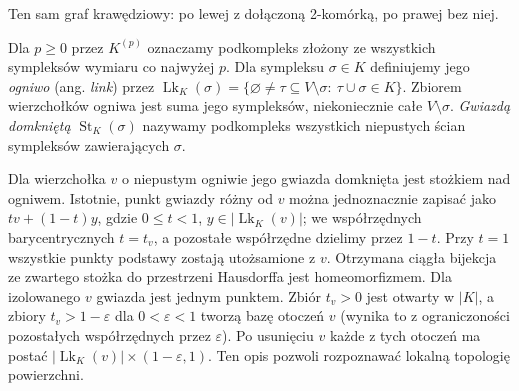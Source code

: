 \begin{samepage}
\begin{center}
\begin{minipage}{.96\linewidth}\centering
{}\par\smallskip

{\footnotesize Ten sam graf krawędziowy: po lewej z dołączoną
2-komórką, po prawej bez niej.}
\end{minipage}
\end{center}
\end{samepage}

\begin{definicja}
Dla $p\ge0$ przez $K^{(p)}$ oznaczamy podkompleks
złożony ze wszystkich sympleksów wymiaru co najwyżej $p$.
Dla sympleksu $\sigma\in K$ definiujemy jego
\emph{ogniwo} (ang. \emph{link}) przez
$\operatorname{Lk}_K(\sigma)
=\{\varnothing\ne\tau\subseteq V\setminus\sigma:
\ \tau\cup\sigma\in K\}$.
Zbiorem wierzchołków ogniwa jest suma jego sympleksów,
niekoniecznie całe $V\setminus\sigma$. \emph{Gwiazdą domkniętą}
$\operatorname{St}_K(\sigma)$ nazywamy podkompleks
wszystkich niepustych ścian sympleksów zawierających $\sigma$.
\end{definicja}

Dla wierzchołka $v$ o niepustym ogniwie jego gwiazda
domknięta jest stożkiem nad ogniwem. Istotnie, punkt
gwiazdy różny od $v$ można jednoznacznie zapisać jako
$t v+(1-t)y$, gdzie $0\le t<1$, $y\in|\operatorname{Lk}_K(v)|$;
we współrzędnych barycentrycznych $t=t_v$, a pozostałe
współrzędne dzielimy przez $1-t$. Przy $t=1$ wszystkie
punkty podstawy zostają utożsamione z $v$. Otrzymana
ciągła bijekcja ze zwartego stożka do przestrzeni Hausdorffa
jest homeomorfizmem. Dla izolowanego $v$ gwiazda jest
jednym punktem. Zbiór $t_v>0$ jest otwarty w $|K|$,
a zbiory $t_v>1-\varepsilon$ dla $0<\varepsilon<1$
tworzą bazę otoczeń $v$ (wynika to z ograniczoności
pozostałych współrzędnych przez $\varepsilon$).
Po usunięciu $v$ każde z tych otoczeń ma postać
$|\operatorname{Lk}_K(v)|\times(1-\varepsilon,1)$.
Ten opis pozwoli rozpoznawać lokalną topologię powierzchni.


